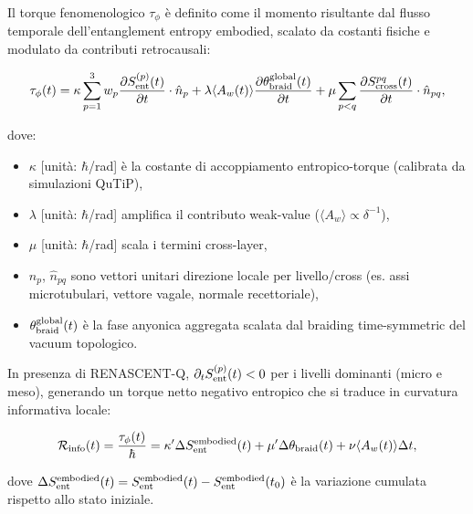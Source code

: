 \documentclass[11pt,a4paper]{article}
\theoremstyle{plain}
\theoremstyle{definition}
\begin{document}
Il torque fenomenologico $\tau_\phi$ è definito come il momento risultante dal flusso temporale dell'entanglement entropy embodied, scalato da costanti fisiche e modulato da contributi retrocausali:

\begin{equation}
\tau_\phi(t) = \kappa \sum_{p=1}^3 w_p \frac{\partial S_{\rm ent}^{(p)}(t)}{\partial t} \cdot \hat{n}_p
+ \lambda \langle A_w(t) \rangle \frac{\partial \theta_{\rm braid}^{\rm global}(t)}{\partial t}
+ \mu \sum_{p<q} \frac{\partial S_{\rm cross}^{pq}(t)}{\partial t} \cdot \hat{n}_{pq},
\label{eq:torque_phen_complete}
\end{equation}

dove:
\begin{itemize}
    \item $\kappa$ [unità: $\hbar$/rad] è la costante di accoppiamento entropico-torque (calibrata da simulazioni QuTiP),
    \item $\lambda$ [unità: $\hbar$/rad] amplifica il contributo weak-value ($\langle A_w \rangle \propto \delta^{-1}$),
    \item $\mu$ [unità: $\hbar$/rad] scala i termini cross-layer,
    \item $\hat{n}_p$, $\hat{n}_{pq}$ sono vettori unitari direzione locale per livello/cross (es. assi microtubulari, vettore vagale, normale recettoriale),
    \item $\theta_{\rm braid}^{\rm global}(t)$ è la fase anyonica aggregata scalata dal braiding time-symmetric del vacuum topologico.
\end{itemize}

In presenza di RENASCENT-Q, $\partial_t S_{\rm ent}^{(p)}(t) < 0$ per i livelli dominanti (micro e meso), generando un torque netto negativo entropico che si traduce in curvatura informativa locale:

\begin{equation}
\mathcal{R}_{\rm info}(t) = \frac{\tau_\phi(t)}{\hbar} = \kappa' \Delta S_{\rm ent}^{\rm embodied}(t) + \mu' \Delta \theta_{\rm braid}(t) + \nu \langle A_w(t) \rangle \Delta t,
\label{eq:curvatura_info_complete}
\end{equation}

dove $\Delta S_{\rm ent}^{\rm embodied}(t) = S_{\rm ent}^{\rm embodied}(t) - S_{\rm ent}^{\rm embodied}(t_0)$ è la variazione cumulata rispetto allo stato iniziale.


\vspace{0.3cm}
\end{document}
